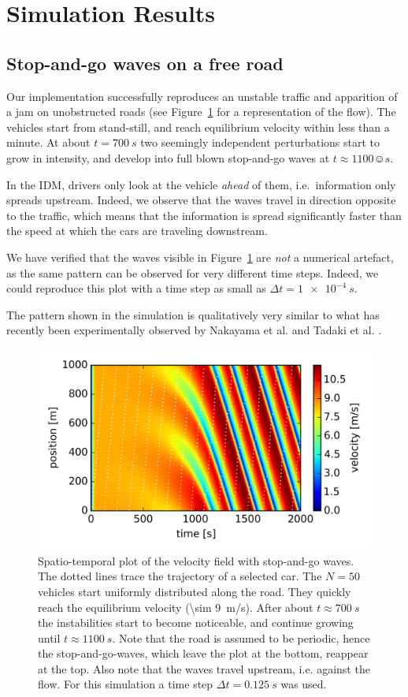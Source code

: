 \section{Simulation Results}
\subsection{Stop-and-go waves on a free road}
Our implementation successfully reproduces an unstable traffic and apparition of a jam on unobstructed roads (see Figure~\ref{fig:free_road} for a representation of the flow). The vehicles start from stand-still, and reach equilibrium velocity within less than a minute. At about $t=\SI{700}{s}$ two seemingly independent perturbations start to grow in intensity, and develop into full blown stop-and-go waves at $t\approx \SI{1100}☺{s}$.

In the IDM, drivers only look at the vehicle \emph{ahead} of them, i.e.\ information only spreads upstream. Indeed, we observe that the waves travel in direction opposite to the traffic, which means that the information is spread significantly faster than the speed at which the cars are traveling downstream.

We have verified that the waves visible in Figure~\ref{fig:free_road} are \emph{not} a numerical artefact, as the same pattern can be observed for very different time steps. Indeed, we could reproduce this plot with a time step as small as $\Delta t =\SI{1e-4}{s}$.

The pattern shown in the simulation is qualitatively very similar to what has recently been experimentally observed by Nakayama et al. \cite{nakayama2009} and Tadaki et al. \cite{tadaki2013}.
\begin{figure}
    \centering
    \includegraphics[width=5in]{../img/free_road.png}
    \caption{Spatio-temporal plot of the velocity field with stop-and-go waves. The dotted lines trace the trajectory of a selected car. The $N=50$ vehicles start uniformly distributed along the road. They quickly reach the equilibrium velocity (\SI{\sim 9}{m/s}). After about $t\approx\SI{700}{s}$ the instabilities start to become noticeable, and continue growing until $t\approx \SI{1100}{s}$. Note that the road is assumed to be periodic, hence the stop-and-go-waves, which leave the plot at the bottom, reappear at the top. Also note that the waves travel upstream, i.e. against the flow. For this simulation a time step $\Delta t=\SI{0.125}{s}$ was used.}
    \label{fig:free_road}
\end{figure}
\newpage
